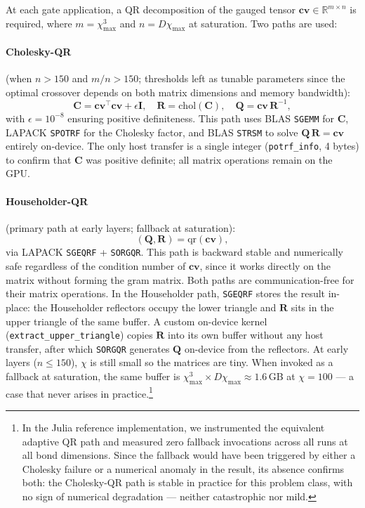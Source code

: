 \documentclass[11pt]{article}
\newcommand{\chimax}{\chi_{\mathrm{max}}}
\begin{document}
At each gate application, a QR decomposition of the gauged tensor
$\mathbf{cv} \in \mathbb{R}^{m \times n}$ is required, where
$m = \chimax^3$ and $n = D\chimax$ at saturation. Two paths are used:

\paragraph{Cholesky-QR~\citep{golub2013matrix}} (when $n > 150$ and $m/n > 150$;
thresholds left as tunable parameters since the optimal crossover
depends on both matrix dimensions and memory bandwidth):
\begin{equation}
 \mathbf{C} = \mathbf{cv}^\top \mathbf{cv} + \epsilon \mathbf{I}, \quad
 \mathbf{R} = \mathrm{chol}(\mathbf{C}), \quad
 \mathbf{Q} = \mathbf{cv}\, \mathbf{R}^{-1},
 \label{eq:cholqr}
\end{equation}
with $\epsilon = 10^{-8}$ ensuring positive definiteness. This path uses
BLAS \texttt{SGEMM} for $\mathbf{C}$, LAPACK \texttt{SPOTRF} for the
Cholesky factor, and BLAS \texttt{STRSM} to solve
$\mathbf{Q}\,\mathbf{R} = \mathbf{cv}$ entirely on-device.
The only host transfer is a single integer (\texttt{potrf\_info}, 4 bytes)
to confirm that $\mathbf{C}$ was positive definite; all matrix operations
remain on the GPU.

\paragraph{Householder-QR} (primary path at early layers; fallback at saturation):
\[
 (\mathbf{Q}, \mathbf{R}) = \mathrm{qr}(\mathbf{cv}),
\]
via LAPACK \texttt{SGEQRF} + \texttt{SORGQR}. This path is backward stable
and numerically safe regardless of the condition number of $\mathbf{cv}$,
since it works directly on the matrix without forming the gram matrix.
Both paths are communication-free for their matrix operations.
In the Householder path, \texttt{SGEQRF} stores the result
in-place: the Householder reflectors occupy the lower triangle and $\mathbf{R}$
sits in the upper triangle of the same buffer. A custom on-device kernel
(\texttt{extract\_upper\_triangle}) copies $\mathbf{R}$ into its own buffer
without any host transfer, after which \texttt{SORGQR} generates $\mathbf{Q}$
on-device from the reflectors.
At early layers ($n \leq 150$), $\chi$ is still small so the matrices are tiny.
When invoked as a fallback at saturation, the same buffer is
$\chimax^3 \times D\chimax \approx 1.6$\,GB at $\chi=100$ --- a case that
never arises in practice.\footnote{In the Julia
reference implementation, we instrumented the equivalent adaptive QR path and
measured zero fallback invocations across all runs at all bond dimensions.
Since the fallback would have been triggered by either a Cholesky failure
or a numerical anomaly in the result, its absence confirms both: the
Cholesky-QR path is stable in practice for this problem class, with no
sign of numerical degradation --- neither catastrophic nor mild.}
\end{document}
